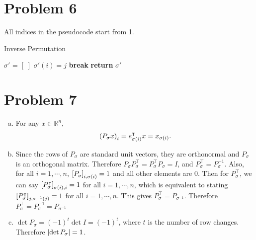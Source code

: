 \documentclass[10pt]{article}
\begin{document}
\section*{Problem 6}
All indices in the pseudocode start from 1.
\begin{algorithm}[H]
    \caption{Inverse Permutation}\label{quicksort}
    \begin{algorithmic}
            \State $\sigma'$ = $[\;]$ 
                        \State $\sigma'(i) = j$
                        \State \textbf{break}
                    \EndIf
                \EndWhile
            \EndWhile
            \State \textbf{return} $\sigma'$
        \EndProcedure
    \end{algorithmic}
\end{algorithm}

\section*{Problem 7}
\begin{enumerate}[(a)]
    \item For any $x \in \mathbb{R}^n$,
    \begin{align*}
        \qty(P_\sigma x)_i = e^\intercal_{\sigma(i)}x = x_{\sigma(i)}.
    \end{align*}
    \item Since the rows of $P_\sigma$ are standard unit vectors, they are orthonormal and $P_\sigma$ is an orthogonal matrix.
    Therefore $P_\sigma P_\sigma^\intercal = P_\sigma^\intercal P_\sigma = I$, and $P_\sigma^\intercal = P_\sigma^{-1}$. 
    Also, for all $i = 1, \cdots, n$, $\qty[P_\sigma]_{i, \sigma(i)} = 1$ and all other elements are $0$. 
    Then for $P_\sigma^\intercal$, we can say $\qty[P_\sigma^\intercal]_{\sigma(i), i} = 1$ for all $i = 1, \cdots, n$, which is equivalent to stating $\qty[P_\sigma^\intercal]_{j, \sigma^{-1}(j)} = 1$ for all $i = 1, \cdots, n$.
    This gives $P_\sigma^\intercal = P_{\sigma^{-1}}$. 
    Therefore $P_\sigma^\intercal = P_\sigma^{-1} = P_{\sigma^{-1}}$
    \item $\det P_\sigma = (-1)^t \det I = (-1)^t$, where $t$ is the number of row changes. Therefore $\qty|\det P_\sigma| = 1$.
\end{enumerate}
\end{document}
